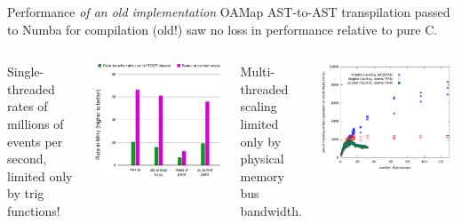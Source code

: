 \documentclass[aspectratio=169]{beamer}
\begin{document}
\begin{frame}{Performance {\it of an old implementation}}
\vspace{0.3 cm}
OAMap AST-to-AST transpilation passed to Numba for compilation (old!) saw no loss in performance relative to pure C.

\vspace{0.2 cm}
\begin{columns}[t]
Single-threaded rates of millions of events per second, limited only by trig functions!

\begin{center}
\includegraphics[height=5 cm]{physical-media.pdf}
\end{center}
Multi-threaded scaling limited only by physical memory bus bandwidth.

\vspace{-0.8\baselineskip}
\begin{center}
\includegraphics[height=5 cm]{knl-scaling.pdf}
\end{center}
\end{columns}
\end{frame}
\end{document}
